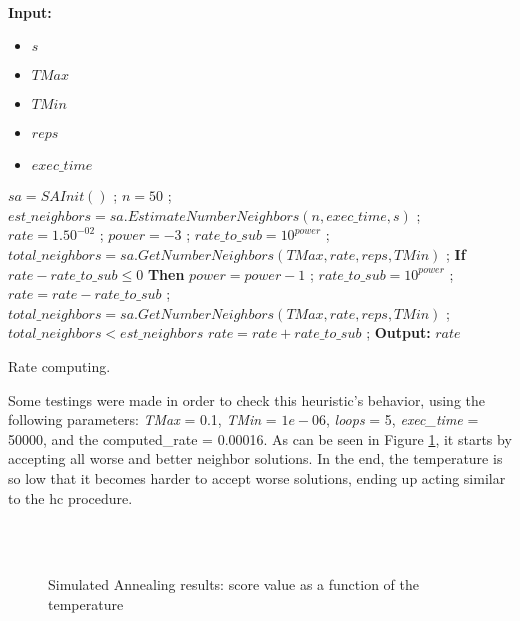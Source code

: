 {\\
\begin{algorithm}[t!]
\textbf{Input:} 
\begin{itemize}
	\setlength{\itemsep}{1pt}
	\item $s$ 
	\item $TMax$ 
	\item $TMin$ 
	\item $reps$ 
	\item $exec\_time$ 
\end{itemize}
\begin{algorithmic}
\State $sa = SAInit()$ ;
\State $n = 50$ ; 
\State $est\_neighbors = sa.EstimateNumberNeighbors(n, exec\_time, s)$ ;
\State $rate = 1.50^{-02}$ ;
\State $power = -3$ ;
\State $rate\_to\_sub = 10^{power}$ ;
\State $total\_neighbors = sa.GetNumberNeighbors(TMax, rate, reps, TMin)$ ;
\Repeat	
	\State \textbf{If} $rate - rate\_to\_sub \leq 0$ \textbf{Then} $power = power - 1$ ; $rate\_to\_sub = 10^{power}$ ;
	\State $rate = rate - rate\_to\_sub$ ;
	\State $total\_neighbors = sa.GetNumberNeighbors(TMax, rate, reps, TMin)$ ;
\Until $total\_neighbors < est\_neighbors$
\State $rate = rate + rate\_to\_sub$ ; 
\State \textbf{Output:} $rate$ 
\end{algorithmic}
\caption{Rate computing.}
\label{alg:RateComputing}
\end{algorithm}Some testings were made in order to check this heuristic's behavior, using the following parameters: \textit{TMax} = 0.1, \textit{TMin} = $1e-06$, \textit{loops} = 5, \textit{exec\_time} = 50000, and the computed\_rate = 0.00016. As can be seen in Figure \ref{fig:SimulatedAnnealingPlot}, it starts by accepting all worse and better neighbor solutions. In the end, the temperature is so low that it becomes harder to accept worse solutions, ending up acting similar to the \gls{hc} procedure.}\\
\\
\begin{figure}[!t]
\centering


\caption{Simulated Annealing results: score value as a function of the temperature} 
\label{fig:SimulatedAnnealingPlot}
\end{figure}

